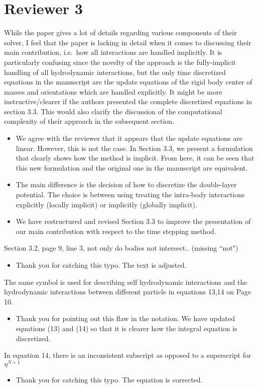 \documentclass[11pt]{article}
\newcommand{\comment}[1]{{\color{blue} #1}}
\begin{document}
\section*{Reviewer 3}
\noindent
\comment{While the paper gives a lot of details regarding various
  components of their solver, I feel that the paper is lacking in detail
  when it comes to discussing their main contribution, i.e.~how all
  interactions are handled implicitly. It is particularly confusing
  since the novelty of the approach is the fully-implicit handling of
  all hydrodynamic interactions, but the only time discretized equations
  in the manuscript are the update equations of the rigid body center of
  masses and orientations which are handled explicitly. It might be more
  instructive/clearer if the authors presented the complete discretized
  equations in section 3.3. This would also clarify the discussion of
the computational complexity of their approach in the subsequent
section.}
\begin{itemize}
  \item We agree with the reviewer that it appears that the update
    equations are linear.  However, this is not the case.  In Section
    3.3, we present a formulation that clearly shows how the method is
    implicit.  From here, it can be seen that this new formulation and
    the original one in the manuscript are equivalent.

  \item The main difference is the decision of how to discretize the
    double-layer potential.  The choice is between using treating the
    intra-body interactions explicitly (locally implicit) or implicitly
    (globally implicit).

  \item We have restructured and revised Section 3.3 to improve the
    presentation of our main contribution with respect to the time
    stepping method.
\end{itemize}

\noindent
\comment{Section 3.2, page 9, line 3, not only do bodies not intersect..
(missing ``not")}
\begin{itemize}
  \item Thank you for catching this typo.  The text is adjusted.
\end{itemize}

\noindent
\comment{The same symbol is used for describing self hydrodynamic
interactions and the hydrodynamic interactions between different
particle in equations 13,14 on Page 10.}
\begin{itemize}
  \item Thank you for pointing out this flaw in the notation.  We have
    updated equations (13) and (14) so that it is clearer how the
    integral equation is discretized.
\end{itemize}

\noindent
\comment{In equation 14, there is an inconsistent subscript as opposed
to a superscript for $\eta^{N+1}$}
\begin{itemize}
  \item Thank you for catching this typo.  The equation is corrected.
\end{itemize}
\end{document}

